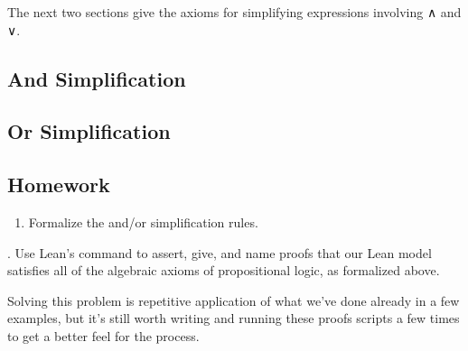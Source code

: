 \documentclass[letterpaper,10pt,english]{sphinxmanual}
\begin{document}
\sphinxAtStartPar
The next two sections give the axioms for simplifying expressions
involving ∧ and ∨.


\subsection{And Simplification}
\label{\detokenize{A_01_Propositional_Logic:and-simplification}}
\begin{sphinxVerbatim}[commandchars=\\\{\}]
\end{sphinxVerbatim}


\subsection{Or Simplification}
\label{\detokenize{A_01_Propositional_Logic:or-simplification}}
\begin{sphinxVerbatim}[commandchars=\\\{\}]

 
 
\end{sphinxVerbatim}


\subsection{Homework}
\label{\detokenize{A_01_Propositional_Logic:homework}}\begin{enumerate}
%
\item {} 
\sphinxAtStartPar
Formalize the and/or simplification rules.

\end{enumerate}

. Use Lean’s  command to assert,
give, and name proofs that our Lean model
satisfies all of the algebraic axioms of
propositional logic, as formalized above.

\sphinxAtStartPar
Solving this problem is repetitive application
of what we’ve done already in a few examples,
but it’s still worth writing and running these
proofs scripts a few times to get a better feel
for the process.
\end{document}
